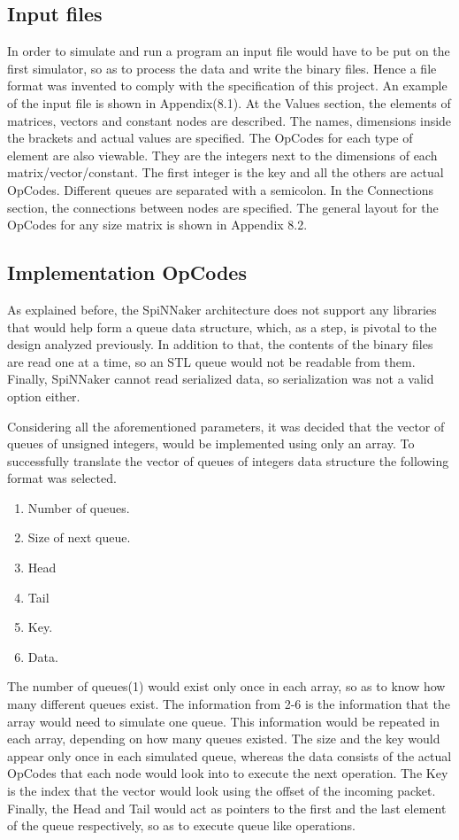 \documentclass[12pt,a4paper]{article}
\begin{document}
\subsection{Input files}
In order to simulate and run a program an input file would have to be put on the first simulator, so as to process the data and write the binary files. Hence a file format was invented to comply with the specification of this project. An example of the input file is shown in Appendix(8.1). At the Values section, the elements of matrices, vectors and constant nodes are described. The names, dimensions inside the brackets and actual values are specified. The OpCodes for each type of element are also viewable. They are the integers next to the dimensions of each matrix/vector/constant. The first integer is the key and all the others are actual OpCodes. Different queues are separated with a semicolon. In the Connections section, the connections between nodes are specified. The general layout for the OpCodes for any size matrix  is shown in Appendix 8.2.
\subsection{Implementation OpCodes}
As explained before, the SpiNNaker architecture does not support any libraries that would help form a queue data structure, which, as a step, is pivotal to the design analyzed previously. In addition to that, the contents of the binary files are read one at a time, so an STL queue would not be readable from them. Finally, SpiNNaker cannot read serialized data, so serialization was not a valid option either.

Considering all the aforementioned parameters, it was decided that the vector of queues of unsigned integers, would be implemented using only an array. To successfully translate the vector of queues of integers data structure the following format was selected.

\begin{enumerate}
\item Number of queues.
\item Size of next queue.
\item Head
\item Tail
\item Key.
\item Data.
\end{enumerate}
The number of queues(1) would exist only once in each array, so as to know how many different queues exist. The information from 2-6 is the information that the array would need to simulate one queue. This information would be repeated in each array, depending on how many queues existed. The size and the key would appear only once in each simulated queue, whereas the data consists of the actual OpCodes that each node would look into to execute the next operation. The Key is the index that the vector would look using the offset of the incoming packet. Finally, the Head and Tail would act as pointers to the first and the last element of the queue respectively, so as to execute queue like operations.
\end{document}
